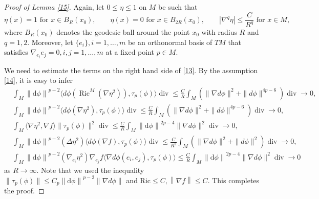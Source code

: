 \documentclass[10pt,a4paper]{amsart}
\def\Ric {\mathrm{Ric}}
\def\d {\mathrm{d}}
\newcommand{\dv}{\operatorname{div}}
\renewcommand{\leq}{\leqslant}
\def\na{\ensuremath{\nabla}}
\newcommand{\norm}[1]{\left\lVert#1\right\rVert}%
\begin{document}
\begin{proof}[Proof of Lemma \ref{15}]
	Again, let  $0\leq\eta\leq 1$ on $M$ be such that
	\begin{equation*}
		\eta(x)=1\textrm{ for } x\in B_R(x_0),\qquad \eta(x)=0\textrm{ for } x\in B_{2R}(x_0),\qquad |\nabla^q\eta|\leq\frac{C}{R^q}\textrm{ for } x\in M,
	\end{equation*}
	where $B_R(x_0)$ denotes the geodesic ball around the point $x_0$ with radius $R$ and $q=1,2$.
	Moreover, let $\{e_i\},i=1,\ldots,m$ be an orthonormal basis of $TM$ that satisfies 
	$\nabla_{e_i}e_j=0,i,j=1,\ldots,m$ at a fixed point $p\in M$.
	
	We need to estimate the terms on 	the right hand side of \eqref{13}. 	By the  assumption \eqref{14},	it is easy to infer
	\begin{align*}
		&\int_M \norm{\d \phi}^{p-2}\langle d\phi(\operatorname{Ric}^M(\nabla\eta^2)),\tau_p(\phi)\rangle \dv\leq\frac{C}{R}\int_M(\|\na d\phi\|^2+\|d\phi\|^{4p-6})\dv \to 0, \\
		&\int_M \norm{\d \phi}^{p-2} \langle d\phi(\nabla\eta^2),\tau_p(\phi)\rangle \dv 
		\leq\frac{C}{R}\int_M(\|\na d\phi\|^2+\|d\phi\|^{4p-6})\dv 
		\to 0,  \\
		&\int_M\langle\nabla\eta^2,\nabla f\rangle\|\tau_p(\phi)\|^2 \dv 
		\leq\frac{C}{R}\int_M \norm{\d \phi}^{2p-4}\|\na d\phi\|^2\dv 
		\to 0, \\
	&\int_M \norm{\d \phi}^{p-2}(\Delta\eta^2)\langle d\phi(\nabla f),\tau_p(\phi)\rangle \dv 
		\leq\frac{C}{R^2}\int_M(\|\na d\phi\|^2+\|d\phi\|^2)\dv 
		\to 0, \\
		&\int_M\norm{\d \phi}^{p-2}(\nabla_{e_i}\eta^2)\nabla_{e_j}f\langle\na d\phi(e_i,e_j),\tau_p(\phi)\rangle 
		\leq\frac{C}{R}\int_M\norm{\d \phi}^{2p-4} \|\na d\phi\|^2 \dv\to 0
	\end{align*}
	as $R\to\infty$.
	Note that we used the inequality $\|\tau_p(\phi)\|\leq C_p \norm{\d \phi}^{p-2}\|\na d\phi\|$ and $ \Ric\leq C, \norm{\na f}\leq C$.
	This completes the proof.
\end{proof}
\end{document}
